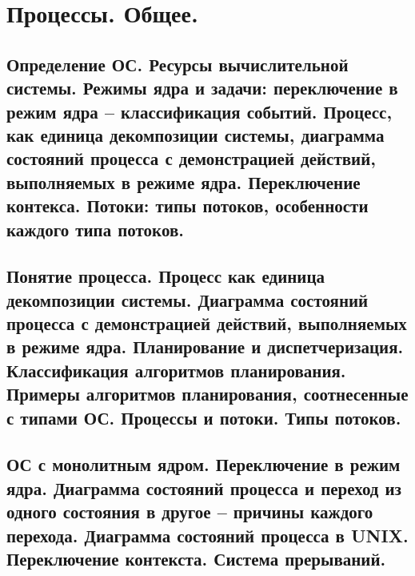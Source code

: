 \section{Процессы. Общее.}

\subsection{Определение ОС. Ресурсы вычислительной системы. Режимы ядра и задачи: переключение в режим ядра – классификация событий. Процесс, как единица декомпозиции системы, диаграмма состояний процесса с демонстрацией действий, выполняемых в режиме ядра. Переключение контекса. Потоки: типы потоков, особенности каждого типа потоков.}

\newpage

\subsection{Понятие процесса. Процесс как единица декомпозиции системы. Диаграмма состояний процесса с демонстрацией действий, выполняемых в режиме ядра. Планирование и диспетчеризация. Классификация алгоритмов планирования. Примеры алгоритмов планирования, соотнесенные с типами ОС. Процессы и потоки. Типы потоков.}

\newpage

\subsection{ОС с монолитным ядром. Переключение в режим ядра. Диаграмма состояний процесса и переход из одного состояния в другое – причины каждого перехода. Диаграмма состояний процесса в UNIX. Переключение контекста. Система прерываний.}
